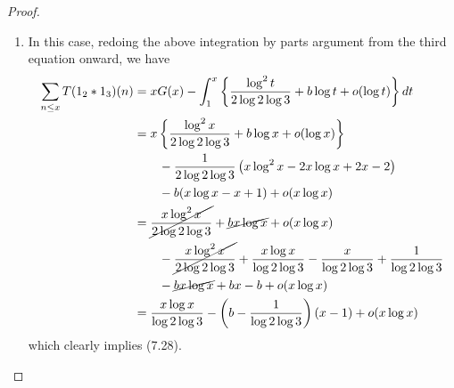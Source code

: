 \documentclass[12pt]{article}
\begin{document}
\begin{proof}
\begin{enumerate}
\item In this case, redoing the above integration by parts argument from the third equation onward, we have
\begin{align*}
\sum_{n \leq x} T(1_2 * 1_3)(n) &= x G(x) - \int_1^x \left\{ \frac{\log^2 t}{2 \log 2 \log 3} + b \log t + o(\log t) \right\} dt \\
&= x \left\{ \frac{\log^2 x}{2 \log 2 \log 3} + b \log x + o(\log x) \right\} \\
&\qquad - \frac{1}{2 \log 2 \log 3} \left( x \log^2 x - 2 x\log x + 2 x - 2 \right) \\
&\qquad - b (x \log x - x + 1) + o(x \log x)\\
&= \cancel{\frac{x \log^2 x}{2 \log 2 \log 3}} + \cancel{b x \log x} + o(x\log x) \\
&\qquad - \cancel{\frac{x \log^2 x}{2 \log 2 \log 3}} + \frac{x\log x}{\log 2 \log 3} - \frac{x}{\log 2 \log 3} + \frac{1}{\log 2 \log 3} \\
&\qquad - \cancel{b x \log x} + bx - b + o(x \log x)\\
&= \frac{x\log x}{\log 2 \log 3} - \left(b - \frac{1}{\log 2 \log 3}\right) (x - 1) + o(x \log x)
\end{align*}
which clearly implies (7.28).
\end{enumerate}
\end{proof}

\unless\ifdefined\IsMainDocument
\end{document}
